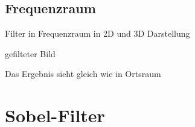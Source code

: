 \documentclass[12pt]{article}
\begin{document}
\subsection{Frequenzraum}
Filter in Frequenzraum in 2D und 3D Darstellung
\begin{figure}[ht]\centering
\end{figure}
\newline
gefilteter Bild
\begin{figure}[ht]\centering
\end{figure}
\newline
Das Ergebnis sieht gleich wie in Ortsraum
\newpage
\section{Sobel-Filter}
\end{document}

